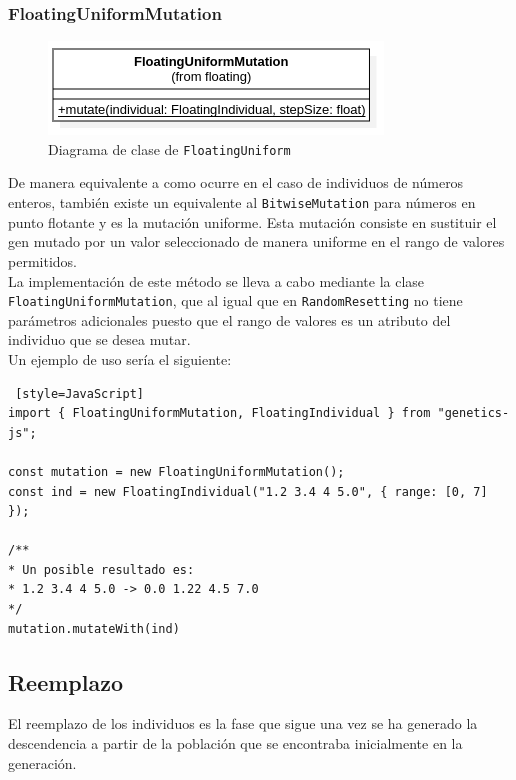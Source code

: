 \subsubsection{FloatingUniformMutation}

\begin{figure}[ht]
    \centering
    \includegraphics[scale=0.6]{mem/images/cap-4/4.2.7(Mutation)/FloatingUniformMutation.png}
    \caption{Diagrama de clase de \texttt{FloatingUniform}}
    \label{fig:my_label}
\end{figure}

De manera equivalente a como ocurre en el caso de individuos de números enteros, también existe un equivalente al \texttt{BitwiseMutation} para números en punto flotante y es la mutación uniforme. Esta mutación consiste en sustituir el gen mutado por un valor seleccionado de manera uniforme en el rango de valores permitidos. \\

La implementación de este método se lleva a cabo mediante la clase \texttt{FloatingUniformMutation}, que al igual que en \texttt{RandomResetting} no tiene parámetros adicionales puesto que el rango de valores es un atributo del individuo que se desea mutar.\\

Un ejemplo de uso sería el siguiente: \\

\begin{lstlisting} [style=JavaScript]
import { FloatingUniformMutation, FloatingIndividual } from "genetics-js";

const mutation = new FloatingUniformMutation();
const ind = new FloatingIndividual("1.2 3.4 4 5.0", { range: [0, 7] });

/**
* Un posible resultado es:
* 1.2 3.4 4 5.0 -> 0.0 1.22 4.5 7.0
*/
mutation.mutateWith(ind)
\end{lstlisting}


\subsection{Reemplazo}

El reemplazo de los individuos es la fase que sigue una vez se ha generado la descendencia a partir de la población que se encontraba inicialmente en la generación. \\

